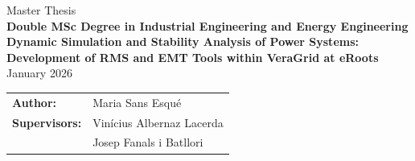 \documentclass[a4paper, 11pt, titlepage, twoside]{article}
\begin{document}


\begin{titlepage}
    {\centering
    {\Huge Master Thesis}\\
    \vspace{5mm}
    {\Large \textbf{Double MSc Degree in Industrial Engineering and Energy Engineering}}\\
    \vspace{20mm}
    \Huge \textbf{Dynamic Simulation and Stability Analysis of Power Systems: Development of RMS and EMT Tools within VeraGrid at eRoots}\\
    \vspace{10mm}
    \Large{January 2026}\\  %
    }
    \vspace{25mm}
    \hspace{2mm}
    \begin{tabular}{l@{ } l}
        \vspace{5mm}
        \Large \textbf{Author:} & \hspace{3mm} \Large{Maria Sans Esqué} \\
        \vspace{5mm}
    \Large\textbf{Supervisors:} & \hspace{3mm} \Large{Vinícius Albernaz Lacerda} \\
                                & \hspace{3mm} \Large{Josep Fanals i Batllori} \\


\end{tabular}
\end{titlepage}
\end{document}
